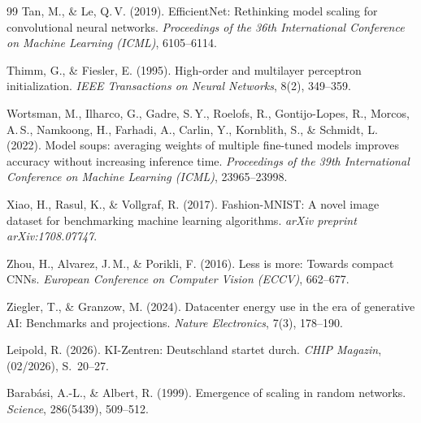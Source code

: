 \documentclass[12pt, a4paper, openany]{report}
\begin{document}
\begin{thebibliography}{99}
Tan, M., \& Le, Q.\,V. (2019).
EfficientNet: Rethinking model scaling for convolutional neural networks.
\textit{Proceedings of the 36th International Conference on Machine
Learning (ICML)}, 6105--6114.

Thimm, G., \& Fiesler, E. (1995).
High-order and multilayer perceptron initialization.
\textit{IEEE Transactions on Neural Networks}, 8(2), 349--359.

Wortsman, M., Ilharco, G., Gadre, S.\,Y., Roelofs, R., Gontijo-Lopes, R.,
Morcos, A.\,S., Namkoong, H., Farhadi, A., Carlin, Y., Kornblith, S.,
\& Schmidt, L. (2022).
Model soups: averaging weights of multiple fine-tuned models improves
accuracy without increasing inference time.
\textit{Proceedings of the 39th International Conference on Machine
Learning (ICML)}, 23965--23998.

Xiao, H., Rasul, K., \& Vollgraf, R. (2017).
Fashion-MNIST: A novel image dataset for benchmarking machine learning
algorithms.
\textit{arXiv preprint arXiv:1708.07747}.

Zhou, H., Alvarez, J.\,M., \& Porikli, F. (2016).
Less is more: Towards compact CNNs.
\textit{European Conference on Computer Vision (ECCV)}, 662--677.

Ziegler, T., \& Granzow, M. (2024).
Datacenter energy use in the era of generative AI: Benchmarks and
projections.
\textit{Nature Electronics}, 7(3), 178--190.

Leipold, R. (2026).
KI-Zentren: Deutschland startet durch.
\textit{CHIP Magazin}, (02/2026), S.~20--27.

Barabási, A.-L., \& Albert, R. (1999).
Emergence of scaling in random networks.
\textit{Science}, 286(5439), 509--512.

\end{thebibliography}
\end{document}
